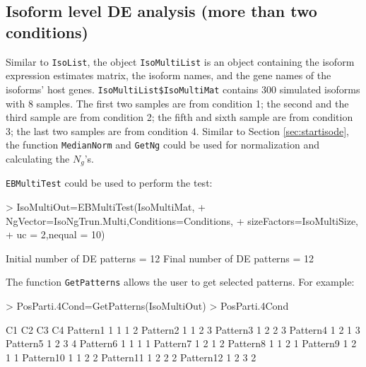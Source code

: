 \documentclass{article}
\begin{document}
\subsection{Isoform level DE analysis (more than two conditions)}
\label{sec:startisomulticond}
\noindent Similar to \verb+IsoList+,
the object \verb+IsoMultiList+ is an object containing the isoform expression estimates matrix, the isoform 
names, and the gene names of the isoforms' host genes. 
\verb+IsoMultiList$IsoMultiMat+ contains 300 simulated isoforms with 8 samples. 
The first two samples are from condition 1; the second and the third sample are 
from condition 2; the fifth and sixth sample are from condition 3; 
the last two samples are from condition 4.
Similar to Section \ref{sec:startisode},  the function \verb+MedianNorm+ and \verb+GetNg+ could be used for normalization 
and calculating the $N_g$'s. 
\begin{Schunk}
\end{Schunk}



\noindent
\verb+EBMultiTest+ could be used to perform the test:
\begin{Schunk}
\begin{Sinput}
> IsoMultiOut=EBMultiTest(IsoMultiMat,
+ NgVector=IsoNgTrun.Multi,Conditions=Conditions,
+ sizeFactors=IsoMultiSize, 
+ uc = 2,nequal = 10)
\end{Sinput}
\begin{Soutput}
Initial number of DE patterns = 12
Final number of DE patterns = 12
\end{Soutput}
\end{Schunk}

The function \verb+GetPatterns+ allows the user to get selected patterns. For example:

\begin{Schunk}
\begin{Sinput}
> PosParti.4Cond=GetPatterns(IsoMultiOut)
> PosParti.4Cond
\end{Sinput}
\begin{Soutput}
          C1 C2 C3 C4
Pattern1   1  1  1  2
Pattern2   1  1  2  3
Pattern3   1  2  2  3
Pattern4   1  2  1  3
Pattern5   1  2  3  4
Pattern6   1  1  1  1
Pattern7   1  2  1  2
Pattern8   1  1  2  1
Pattern9   1  2  1  1
Pattern10  1  1  2  2
Pattern11  1  2  2  2
Pattern12  1  2  3  2
\end{Soutput}
\end{Schunk}
\end{document}
